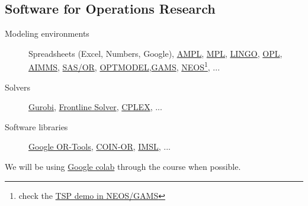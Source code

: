   \subsection{Software for Operations Research}
 \begin{description}
   \item[Modeling environments] Spreadsheets (Excel, Numbers, Google), \href{https://ampl.com}{AMPL}, \href{http://www.maximalsoftware.com/mpl/}{MPL}, \href{https://www.lindo.com/index.php/products/lingo-and-optimization-modeling}{LINGO}, \href{https://www.ibm.com/docs/en/icos/12.9.0?topic=opl-optimization-programming-language}{OPL}, \href{https://www.aimms.com}{AIMMS}, \href{https://www.sas.com/es_es/software/or.html}{SAS/OR}, \href{https://support.sas.com/rnd/app/or/procedures/optmodel.html}{OPTMODEL},\href{https://www.gams.com}{GAMS}, \href{https://neos-guide.org}{NEOS}\footnote{check the \href{https://neos-guide.org/content/or}{TSP demo in NEOS/GAMS}}, ...
   \item[Solvers] \href{https://www.gurobi.com}{Gurobi},
   \href{https://www.solver.com}{Frontline Solver},
   \href{https://www.ibm.com/products/ilog-cplex-optimization-studio}{CPLEX}, ...
   \item[Software libraries] \href{https://developers.google.com/optimization}{Google OR-Tools}, \href{https://www.coin-or.org}{COIN-OR}, \href{https://www.imsl.com}{IMSL}, ...
 \end{description}
 We will be using \href{https://github.com/JordiVillaFreixa/ORcode}{Google colab} through the course when possible.



